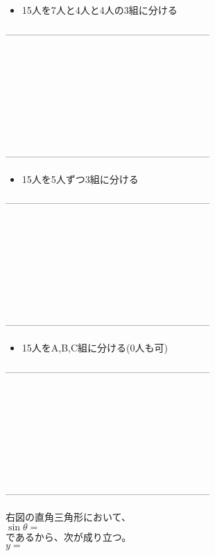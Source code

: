 \documentclass[twocolumn, 20pt]{jarticle}
\begin{document}
\begin{itemize}
  \item 15人を7人と4人と4人の3組に分ける
\end{itemize}
---------------------------------------------------------------
\\
\\
\\
\\
\\
\\
\\
\\
\\
---------------------------------------------------------------
\begin{itemize}
  \item 15人を5人ずつ3組に分ける
\end{itemize}
---------------------------------------------------------------
\\
\\
\\
\\
\\
\\
\\
\\
\\
---------------------------------------------------------------
\begin{itemize}
  \item 15人をA,B,C組に分ける(0人も可)
\end{itemize}
---------------------------------------------------------------
\\
\\
\\
\\
\\
\\
\\
\\
\\
---------------------------------------------------------------

右図の直角三角形において、\\
\qquad \qquad $\displaystyle \sin \theta = $\\であるから、次が成り立つ。\\
\qquad \qquad $\displaystyle y= $
\end{document}
